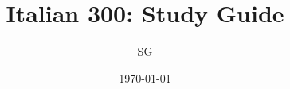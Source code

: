     \title{Italian 300: Study Guide}
    \author{SG}
    \date{\today}
    \maketitle
    \tableofcontents
    
